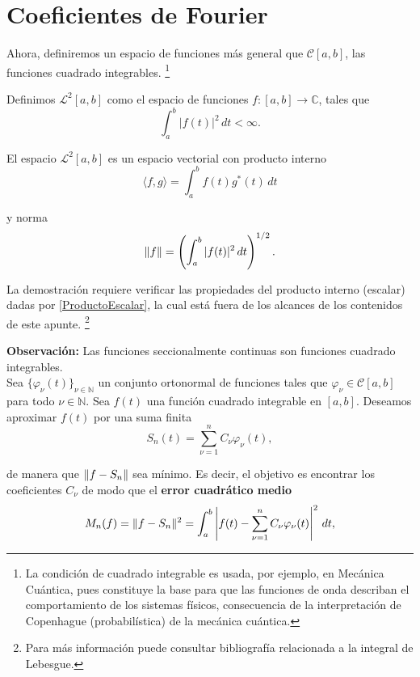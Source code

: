 \newpage
\section{Coeficientes de Fourier}

Ahora, definiremos un espacio de funciones más general que $\mathscr{C}[a,b]$, las funciones cuadrado integrables. \footnote{La condición de cuadrado integrable es usada, por ejemplo, en Mecánica Cuántica, pues constituye la base para que las funciones de onda describan el comportamiento de los sistemas físicos, consecuencia de la interpretación de Copenhague (probabilística) de la mecánica cuántica.}

\begin{defi}
    Definimos $\mathcal{L}^2[a,b]$ como el espacio de funciones $f:[a,b] \rightarrow \mathbb{C}$, tales que 
    $$\int_a^b |f(t)|^2 \,dt < \infty.$$
\end{defi}

\begin{teorema}
El espacio $\mathcal{L}^2[a,b]$ es un espacio vectorial con producto interno 
$$\langle f,g \rangle = \int_a^b f(t) g^* (t) \,dt$$

y norma
$$\lVert f\rVert = \left( \int_a^b |f(t)|^2 \,dt \right)^{1/2}.$$
\end{teorema}

La demostración requiere verificar las propiedades del producto interno (escalar) dadas por \ref{ProductoEscalar}, la cual está fuera de los alcances de los contenidos de este apunte. \footnote{Para más información puede consultar bibliografía relacionada a la integral de Lebesgue.} 

\textbf{Observación:} Las funciones seccionalmente continuas son funciones cuadrado integrables.
\\

Sea $\{\varphi_{\nu}(t)\}_{\nu \in \mathbb{N}}$ un conjunto ortonormal de funciones tales que $\varphi_{\nu} \in \mathscr{C}[a,b]$ para todo $\nu \in \mathbb{N}$. Sea $f(t)$ una función cuadrado integrable en $[a,b]$. Deseamos aproximar $f(t)$ por una suma finita 
$$S_n(t) = \sum_{\nu = 1}^n C_{\nu} \varphi_{\nu}(t),$$

de manera que $\lVert f - S_n\rVert$ sea mínimo. Es decir, el objetivo es encontrar los coeficientes $C_{\nu}$ de modo que el \textbf{error cuadrático medio}
$$M_n(f) = \lVert f-S_n\rVert^2 = \int_a^b \left| f(t) - \sum_{\nu = 1}^n C_{\nu} \varphi_{\nu}(t) \right|^2 \,dt,$$

